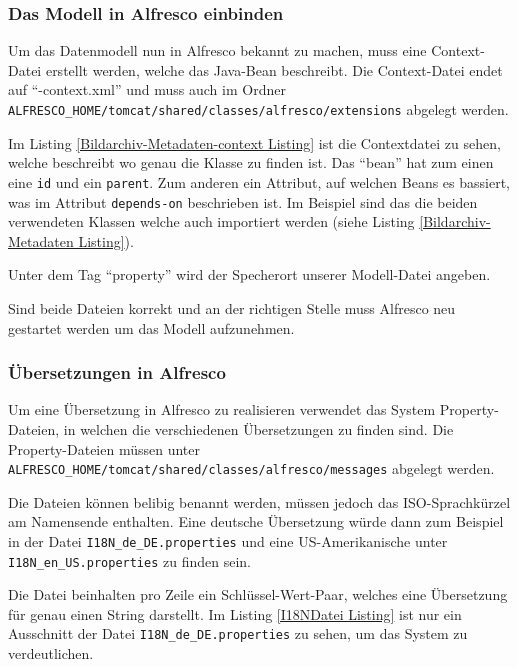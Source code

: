 \subsubsection{Das Modell in Alfresco einbinden} \label{Das Modell in Alfresco einbinden}
Um das Datenmodell nun in Alfresco bekannt zu machen, muss eine Context-Datei erstellt werden, welche das Java-Bean beschreibt. Die Context-Datei endet auf "`-context.xml"' und muss auch im Ordner \texttt{ALFRESCO\_HOME/tomcat/shared/classes/alfresco/extensions} abgelegt werden.

Im Listing \ref{Bildarchiv-Metadaten-context Listing} ist die Contextdatei zu sehen, welche beschreibt wo genau die Klasse zu finden ist.
Das "`bean"' hat zum einen eine \texttt{id} und ein \texttt{parent}. Zum anderen ein Attribut, auf welchen Beans es bassiert, was im Attribut \texttt{depends-on} beschrieben ist. Im Beispiel sind das die beiden verwendeten Klassen welche auch importiert werden (siehe Listing \ref{Bildarchiv-Metadaten Listing}).

Unter dem Tag "`property"' wird der Specherort unserer Modell-Datei angeben.



Sind beide Dateien korrekt und an der richtigen Stelle muss Alfresco neu gestartet werden um das Modell aufzunehmen.

\subsubsection{\"Ubersetzungen in Alfresco}
Um eine \"Ubersetzung in Alfresco zu realisieren verwendet das System Property-Dateien, in welchen die verschiedenen \"Ubersetzungen zu finden sind. Die Property-Dateien m\"ussen unter \texttt{ALFRESCO\_HOME/tomcat/shared/classes/alfresco/messages} abgelegt werden.

Die Dateien k\"onnen belibig benannt werden, m\"ussen jedoch das ISO-Sprachk\"urzel am Namensende enthalten. Eine deutsche \"Ubersetzung w\"urde dann zum Beispiel in der Datei \texttt{I18N\_de\_DE.properties} und eine US-Amerikanische unter \texttt{I18N\_en\_US.properties} zu finden sein.

Die Datei beinhalten pro Zeile ein Schl\"ussel-Wert-Paar, welches eine \"Ubersetzung f\"ur genau einen String darstellt.
Im Listing \ref{I18NDatei Listing} ist nur ein Ausschnitt der Datei \texttt{I18N\_de\_DE.properties} zu sehen, um das System zu verdeutlichen.

